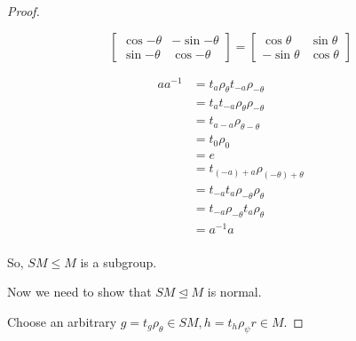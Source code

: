\documentclass[12pt,letterpaper]{article}
\begin{document}
\begin{enumerate}
\begin{proof}
\begin{itemize}
            \[
              \begin{bmatrix}
                \cos{-\theta} & -\sin{-\theta} \\
                \sin{-\theta} & \cos{-\theta}
              \end{bmatrix}
              =
              \begin{bmatrix}
                \cos{\theta} & \sin{\theta} \\
                -\sin{\theta} & \cos{\theta}
              \end{bmatrix}
            \]

            \begin{align*}
              aa^{-1} &= t_a \rho_\theta t_{-a} \rho_{-\theta} \\
              &= t_a t_{-a} \rho_\theta \rho_{-\theta}  \\
              &= t_{a - a} \rho_{\theta - \theta}  \\
              &= t_0 \rho_0  \\
              &= e  \\
              &= t_{(- a) + a} \rho_{(-\theta) + \theta}  \\
              &= t_{-a} t_a \rho_{-\theta} \rho_\theta  \\
              &= t_{-a} \rho_{-\theta} t_a \rho_\theta  \\
              &= a^{-1}a \\
            \end{align*}
        \end{itemize}

        So, $SM \le M$ is a subgroup.

        Now we need to show that $SM \trianglelefteq M$ is normal.

        Choose an arbitrary $g = t_g \rho_\theta \in SM, h = t_h \rho_\psi r \in M$.


\end{proof}
\end{enumerate}
\end{document}
